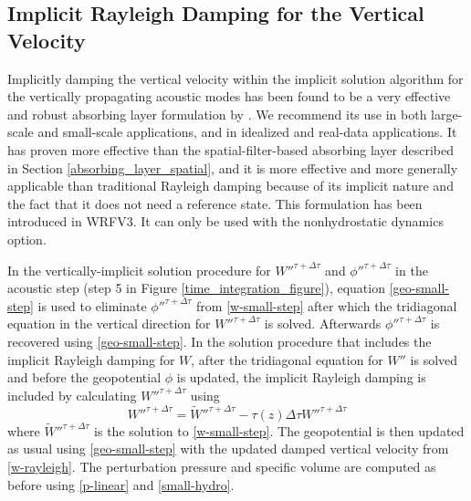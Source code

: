 \subsection{Implicit Rayleigh Damping for the Vertical Velocity}
\label{rayleigh-w}

Implicitly damping the vertical velocity within the implicit solution
algorithm for the vertically propagating acoustic modes has been found
to be a very effective and robust absorbing layer formulation by
\citet{klemp_et_al_2008}.  We recommend its use in both large-scale and
small-scale applications, and in idealized and real-data applications.
It has proven more effective than the spatial-filter-based absorbing
layer described in Section \ref{absorbing_layer_spatial}, and it is more
effective and more generally applicable than traditional Rayleigh
damping because of its implicit nature and the fact that it does not
need a reference state.  This formulation has been introduced in WRFV3.
It can only be used with the nonhydrostatic dynamics option.

In the vertically-implicit solution procedure for $W''^{\tau+\Delta
\tau}$ and $\phi''^{\tau+\Delta \tau}$ in the acoustic step (step 5 in
Figure \ref{time_integration_figure}), equation \eqref{geo-small-step}
is used to eliminate $\phi''^{\tau+\Delta \tau}$ from
\eqref{w-small-step} after which the tridiagonal equation in the
vertical direction for
$W''^{\tau+\Delta \tau}$ is solved.  Afterwards $\phi''^{\tau+\Delta \tau}$ is
recovered using \eqref{geo-small-step}.  In the solution procedure that
includes the implicit Rayleigh damping for $W$, after the tridiagonal
equation for $W''$ %
is solved and before the
geopotential $\phi$ is updated, the implicit Rayleigh damping is
included by calculating $W''^{\tau+\Delta \tau}$ using
%
\begin{equation}
W''^{\tau+\Delta \tau} = \tilde{W}''^{\tau+\Delta \tau} 
-\tau(z) \Delta \tau W''^{\tau+\Delta \tau}
\label{w-rayleigh}
\end{equation}
%
where $\tilde{W}''^{\tau+\Delta \tau}$ is the solution to
\eqref{w-small-step}.  The geopotential is then updated as usual using
\eqref{geo-small-step} with the updated damped vertical velocity from
\eqref{w-rayleigh}.
The perturbation pressure and specific volume
are computed as before using \eqref{p-linear} and \eqref{small-hydro}.

